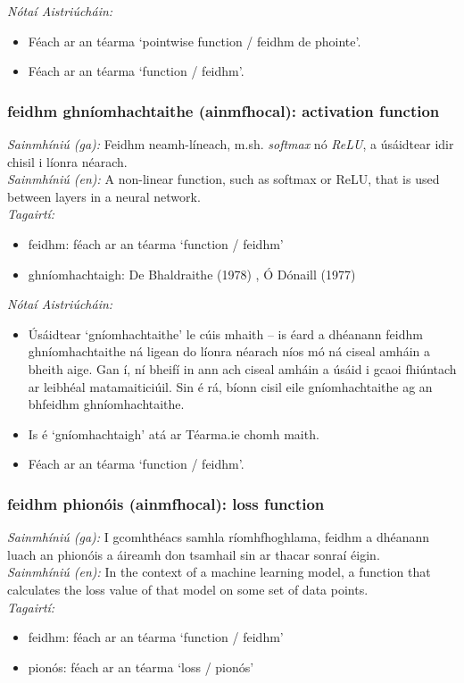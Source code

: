  \noindent \textit{Nótaí Aistriúcháin:}
\begin{itemize}
	\item Féach ar an téarma `pointwise function / feidhm de phointe'.
	\item Féach ar an téarma `function / feidhm'.
\end{itemize}


\subsubsection*{feidhm ghníomhachtaithe (ainmfhocal): activation function}
 \noindent \textit{Sainmhíniú (ga):} Feidhm neamh-líneach, m.sh.  \noindent \textit{softmax} nó  \noindent \textit{ReLU}, a úsáidtear idir chisil i líonra néarach.
\\
 \noindent \textit{Sainmhíniú (en):} A non-linear function, such as softmax or ReLU, that is used between layers in a neural network.
\\
 \noindent \textit{Tagairtí:}
\begin{itemize}
	\item feidhm: féach ar an téarma `function / feidhm'
	\item ghníomhachtaigh: De Bhaldraithe (1978) \cite{de-bhaldraithe}, Ó Dónaill (1977) \cite{odonaill}
\end{itemize}

 \noindent \textit{Nótaí Aistriúcháin:}
\begin{itemize}
	\item Úsáidtear `gníomhachtaithe' le cúis mhaith -- is éard a dhéanann feidhm ghníomhachtaithe ná ligean do líonra néarach níos mó ná ciseal amháin a bheith aige. Gan í, ní bheifí in ann ach ciseal amháin a úsáid i gcaoi fhiúntach ar leibhéal matamaiticiúil. Sin é rá, bíonn cisil eile gníomhachtaithe ag an bhfeidhm ghníomhachtaithe.
	\item Is é `gníomhachtaigh' atá ar Téarma.ie chomh maith.
	\item Féach ar an téarma `function / feidhm'.
\end{itemize}


\subsubsection*{feidhm phionóis (ainmfhocal): loss function}
 \noindent \textit{Sainmhíniú (ga):} I gcomhthéacs samhla ríomhfhoghlama, feidhm a dhéanann luach an phionóis a áireamh don tsamhail sin ar thacar sonraí éigin.
\\
 \noindent \textit{Sainmhíniú (en):} In the context of a machine learning model, a function that calculates the loss value of that model on some set of data points.
\\
 \noindent \textit{Tagairtí:}
\begin{itemize}
	\item feidhm: féach ar an téarma `function / feidhm'
	\item pionós: féach ar an téarma `loss / pionós'
\end{itemize}

